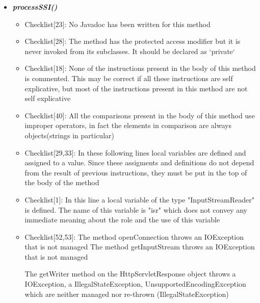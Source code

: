 \documentclass[11pt,titlepage]{article} %
\begin{document}
\begin{itemize}
   \item \textbf{\textit{processSSI()}}
    \begin{itemize}
     \item Checklist[23]: No Javadoc has been written for this method
     \item Checklist[28]: The method has the protected access modifier but it is never invoked from its subclasses. \newline It should be declared as `private`
     \item Checklist[18]: None of the instructions present in the body of this method is commented. This may be
      correct if all these instructions are self explicative, but most of the instructions
      present in this method are not self explicative
    \item Checklist[40]: All the comparisons present in the body of this method use improper operators, in fact the elements in comparison are always objects(strings in particular)
     \item Checklist[29,33]: In these following lines
      local variables are defined and assigned to a value. Since these assigments and definitions
      do not depend from the result of previous instructions, they must be put in the top
      of the body of the method
      
      
     \item Checklist[1]:
      In this line a local variable of the type "InputStreamReader" is defined. The name of
      this variable is "isr" which does not convey any immediate meaning about the role and the
      use of this variable
      

     \item Checklist[52,53]:
      The method openConnection throws an IOException that is not managed\newline
      The method getInputStream throws an IOException that is not managed\newline\newline
      
      The getWriter method on the HttpServletResponse object throws a IOException, a IllegalStateException, UnsupportedEncodingException
      which are neither managed nor re-thrown (IllegalStateException)
      
      


\end{itemize}
\end{itemize}
\end{document}

